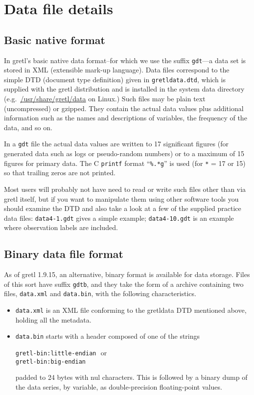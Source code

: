 \chapter{Data file details}
\label{app-datafile}

\section{Basic native format}
\label{native}

In gretl's basic native data format--for which we use the suffix
\texttt{gdt}---a data set is stored in XML (extensible mark-up
language). Data files correspond to the simple DTD (document type
definition) given in \verb+gretldata.dtd+, which is supplied with the
gretl distribution and is installed in the system data directory
(e.g.\ \url{/usr/share/gretl/data} on Linux.)  Such files may be plain
text (uncompressed) or gzipped.  They contain the actual data values
plus additional information such as the names and descriptions of
variables, the frequency of the data, and so on.

In a \texttt{gdt} file the actual data values are written to 17
significant figures (for generated data such as logs or pseudo-random
numbers) or to a maximum of 15 figures for primary data. The C
\texttt{printf} format ``\verb|%.*g|'' is used (for \texttt{*} = 17 or
15) so that trailing zeros are not printed.

Most users will probably not have need to read or write such files
other than via gretl itself, but if you want to manipulate them
using other software tools you should examine the DTD and also take a
look at a few of the supplied practice data files: \verb+data4-1.gdt+
gives a simple example; \verb+data4-10.gdt+ is an example where
observation labels are included.

\section{Binary data file format}
\label{bindata}

As of gretl 1.9.15, an alternative, binary format is available for
data storage. Files of this sort have suffix \texttt{gdtb}, and they
take the form of a  archive containing two files,
\texttt{data.xml} and \texttt{data.bin}, with the following
characteristics.
\begin{itemize}
\item \texttt{data.xml} is an XML file conforming to the gretldata DTD
  mentioned above, holding all the metadata.
\item \texttt{data.bin} starts with a header composed of one of the
  strings

  \texttt{gretl-bin:little-endian} \,\,or \\
  \texttt{gretl-bin:big-endian}

  padded to 24 bytes with nul characters.  This is followed by a
  binary dump of the data series, by variable, as double-precision
  floating-point values.
\end{itemize}

